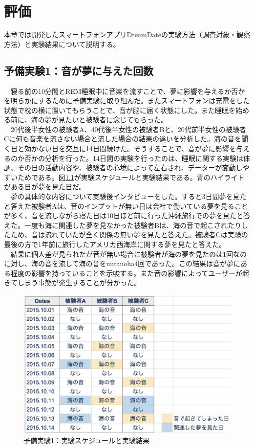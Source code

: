 \chapter{評価}
\label{chap:ledoxea}
本章では開発したスマートフォンアプリDreamDateの実験方法（調査対象・観察方法）と実験結果について説明する。

\section{予備実験1：音が夢に与えた回数}
　寝る前の10分間とREM睡眠中に音楽を流すことで、夢に影響を与えるか否かを明らかにするために予備実験に取り組んだ。またスマートフォンは充電をした状態で枕の横に置いてもらうことで、音が脳に届く状態にした。また睡眠を始める前に、海の夢が見たいと被験者に念じてもらった。\\
　20代後半女性の被験者A、40代後半女性の被験者Bと、20代前半女性の被験者Cに何も音楽を流さない場合と流した場合の結果の違いを分析した。海の音を聞く日と効かない日を交互に14日間続けた。そうすることで、音が夢に影響を与えるのか否かの分析を行った。14日間の実験を行ったのは、睡眠に関する実験は体調、その日の活動内容や、被験者の心境によって左右され、データーが変動しやすいためである。図\ref{experiment1}が実験スケジュールと実験結果である。青のハイライトがある日が夢を見た日だ。\\
　夢の具体的な内容について実験後インタビューをした。すると3日間夢を見たと答えた被験者Aは、音のインプットが無い日は会社で働いている夢を見ることが多く、音を流しながら寝た日は10日ほど前に行った沖縄旅行での夢を見たと答えた。一度も海に関連した夢を見なかった被験者Bは、海の音で起こされたりしたため、音は流れていたが全く関係の無い夢を見たと答えた。被験者Cは実験の最後の方で1年前に旅行したアメリカ西海岸に関する夢を見たと答えた。\\
　結果に個人差が見られたが音が無い場合に被験者が海の夢を見たのは1回なのに対し、海の音を流して海の音をmitanoha4回であった。この結果は音が夢にある程度の影響を持っていることを示唆する。また音の影響によってユーザーが起きてしまう事態が発生することが分かった。

\begin{figure}[htbp]
\begin{center}
\includegraphics[width=13cm]{eps/schedule0.eps}
\caption{予備実験1：実験スケジュールと実験結果}
\label{experiment1}
\end{center}
\end{figure}

